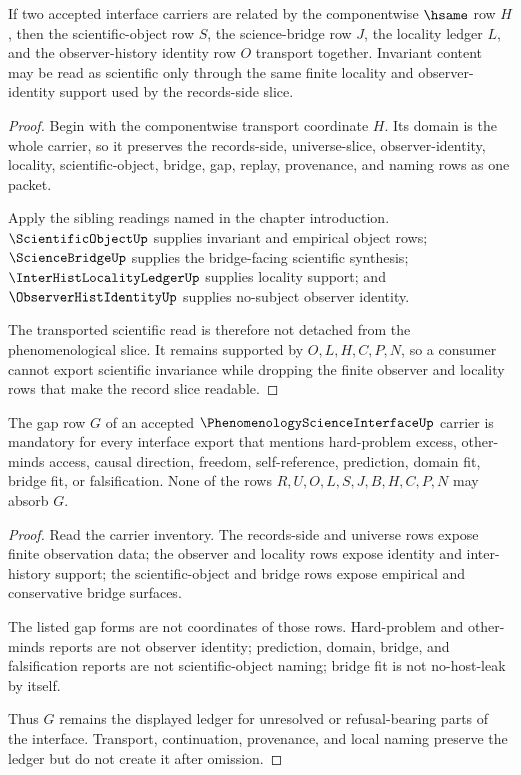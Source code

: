 \begin{theorem}
\label{thm:phenomenology-science-interface-invariant-transport}
If two accepted interface carriers are related by the componentwise $\hsame$ row $H$, then the scientific-object row $S$, the science-bridge row $J$, the locality ledger $L$, and the observer-history identity row $O$ transport together. Invariant content may be read as scientific only through the same finite locality and observer-identity support used by the records-side slice.
\end{theorem}
\begin{proof}
Begin with the componentwise transport coordinate $H$. Its domain is the whole carrier, so it preserves the records-side, universe-slice, observer-identity, locality, scientific-object, bridge, gap, replay, provenance, and naming rows as one packet.

Apply the sibling readings named in the chapter introduction. $\ScientificObjectUp$ supplies invariant and empirical object rows; $\ScienceBridgeUp$ supplies the bridge-facing scientific synthesis; $\InterHistLocalityLedgerUp$ supplies locality support; and $\ObserverHistIdentityUp$ supplies no-subject observer identity.

The transported scientific read is therefore not detached from the phenomenological slice. It remains supported by $O,L,H,C,P,N$, so a consumer cannot export scientific invariance while dropping the finite observer and locality rows that make the record slice readable.
\end{proof}

\begin{theorem}
\label{thm:phenomenology-science-interface-gap-ledger}
The gap row $G$ of an accepted $\PhenomenologyScienceInterfaceUp$ carrier is mandatory for every interface export that mentions hard-problem excess, other-minds access, causal direction, freedom, self-reference, prediction, domain fit, bridge fit, or falsification. None of the rows $R,U,O,L,S,J,B,H,C,P,N$ may absorb $G$.
\end{theorem}
\begin{proof}
Read the carrier inventory. The records-side and universe rows expose finite observation data; the observer and locality rows expose identity and inter-history support; the scientific-object and bridge rows expose empirical and conservative bridge surfaces.

The listed gap forms are not coordinates of those rows. Hard-problem and other-minds reports are not observer identity; prediction, domain, bridge, and falsification reports are not scientific-object naming; bridge fit is not no-host-leak by itself.

Thus $G$ remains the displayed ledger for unresolved or refusal-bearing parts of the interface. Transport, continuation, provenance, and local naming preserve the ledger but do not create it after omission.
\end{proof}

